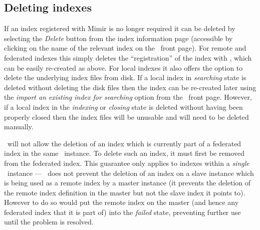 \subsection{Deleting indexes}

If an index registered with Mimir is no longer required it can be deleted by
selecting the {\em Delete} button from the index information page (accessible
by clicking on the name of the relevant index on the \Mimir\ front page).  For
remote and federated indexes this simply deletes the ``registration'' of the
index with \Mimir, which can be easily re-created as above.  For local indexes
it also offers the option to delete the underlying index files from disk.  If a
local index in {\em searching} state is deleted without deleting the disk files
then the index can be re-created later using the {\em import an existing index
for searching} option from the \Mimir\ front page.  However, if a local index
in the {\em indexing} or {\em closing} state is deleted without having been
properly closed then the index files will be unusable and will need to be
deleted manually.

\Mimir\ will not allow the deletion of an index which is currently part of a
federated index in the same \Mimir\ instance.  To delete such an index, it must
first be removed from the federated index.  This guarantee only applies to
indexes within a {\em single} \Mimir\ instance --- \Mimir\ does not prevent the
deletion of an index on a slave instance which is being used as a remote index
by a master instance (it prevents the deletion of the remote index definition
in the master but not the slave index it points to).  However to do so would
put the remote index on the master (and hence any federated index that it is
part of) into the {\em failed} state, preventing further use until the problem
is resolved.
